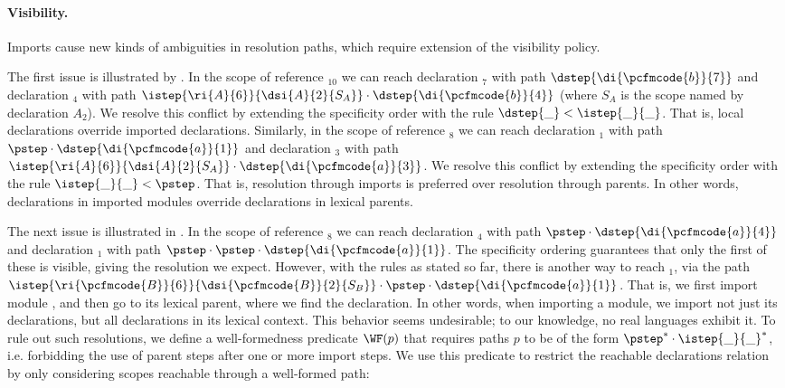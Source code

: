 \paragraph{Visibility.}

Imports cause new kinds of ambiguities in resolution paths, which require
extension of the visibility policy.

The first issue is illustrated by .
In the scope of reference $_{10}$ we can reach declaration
$_7$ with path $\dstep{\di{\pcfmcode{b}}{7}}$ and
declaration $_4$ with path
$\istep{\ri{A}{6}}{\dsi{A}{2}{S_A}}\cdot\dstep{\di{\pcfmcode{b}}{4}}$
(where $S_A$ is the scope named by declaration $A_2$).
We resolve this conflict by extending the specificity order with the rule
$\dstep{\_} < \istep{\_}{\_}$.
That is, local declarations override imported declarations.
Similarly, in the scope of reference $_8$ we can reach declaration
$_1$ with path $\pstep\cdot\dstep{\di{\pcfmcode{a}}{1}}$ and
declaration $_3$ with path
$\istep{\ri{A}{6}}{\dsi{A}{2}{S_A}}\cdot\dstep{\di{\pcfmcode{a}}{3}}$. 
We resolve this conflict by extending the specificity order with the rule
$\istep{\_}{\_} < \pstep$.
That is, resolution through imports is preferred over resolution through
parents. 
In other words, declarations in imported modules override declarations in
lexical parents.




The next issue is illustrated in . 
In the scope of reference $_8$ we can reach declaration
$_4$ with path $\pstep\cdot\dstep{\di{\pcfmcode{a}}{4}}$ and
declaration $_1$ with path $\pstep\cdot\pstep\cdot\dstep{\di{\pcfmcode{a}}{1}}$.
The specificity ordering guarantees that only the first of these is visible, giving
the resolution we expect.  However, with the rules as stated so far, there
is another way to reach $_1$, via the path
$\istep{\ri{\pcfmcode{B}}{6}}{\dsi{\pcfmcode{B}}{2}{S_B}}\cdot
\pstep\cdot\dstep{\di{\pcfmcode{a}}{1}}$.
That is, we first import module , and then go to its lexical 
parent, where we find the declaration.  In other words,
when importing a module, we 
import not just its declarations, but all declarations in its lexical context.
This behavior seems undesirable; to our knowledge, no real languages exhibit it. 
To rule out such resolutions, we define a well-formedness predicate $\WF(p)$
that requires paths $p$ to be of the form $\pstep^* \cdot \istep{\_}{\_}^*$, 
i.e. forbidding the use of parent steps after one or more import
steps. We use this predicate to restrict the reachable declarations relation by
only considering scopes reachable through a well-formed path:

